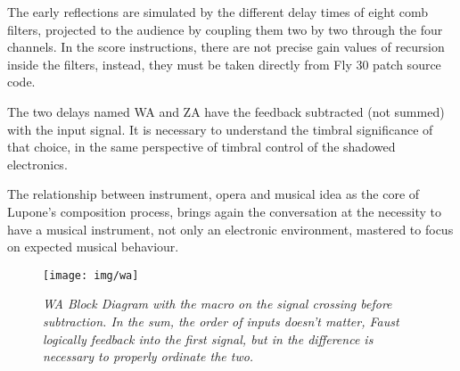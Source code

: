 \documentclass[twoside,a4paper]{article}
\begin{document}
The early reflections are simulated by the different delay times of eight comb
filters, projected to the audience by coupling them two by two through the four
channels. In the score instructions, there are not precise gain values of recursion
inside the filters, instead, they must be taken directly from Fly 30 patch source
code.

The two delays named WA and ZA have the feedback subtracted (not summed) with the
input signal. It is necessary to understand the timbral significance of that
choice, in the same perspective of timbral control of the shadowed electronics.

The relationship between instrument, opera and musical idea as the core of Lupone's
composition process, brings again the conversation at the necessity to have a
musical instrument, not only an electronic environment, mastered to focus on
expected musical behaviour.



\begin{figure}[ht]
\centerline{\texttt{[image: img/wa]}}
\caption{\label{wa-block}{\it WA Block Diagram with the macro on the signal
crossing before subtraction. In the sum, the order of inputs doesn't matter,
\emph{Faust} logically feedback into the first signal, but in the difference is
necessary to properly ordinate the two.}}
\end{figure}

\end{document}
